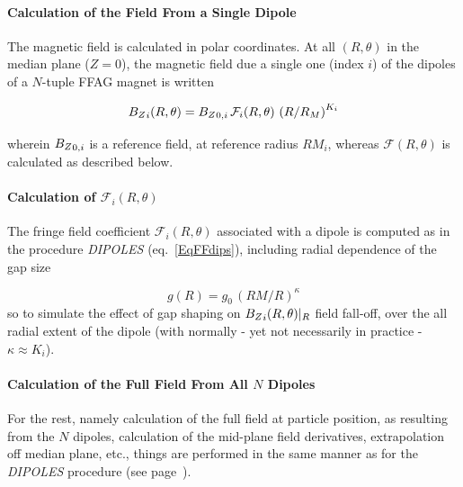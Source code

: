 \medskip


\paragraph{Calculation of the Field From a Single Dipole} 

 \noindent The magnetic field is calculated in  polar
coordinates.  At all $(R,\theta)$ in the median plane ($Z=0$), the 
magnetic field  due  a single one (index $i$) of the  dipoles  of a $N$-tuple FFAG  magnet is written 

$$ {B_Z}_i(R,\theta) =  {B_Z}_{0,i} \, \mathcal{F}_i(R,\theta) \, \left(   R/R_M \right)^{K_i}  $$

\noindent wherein ${B_Z}_{0,i}$  is a reference field, at reference radius  $RM_{i}$, 
 whereas $ \mathcal{F}(R,\theta)$ is calculated as described below. 



\paragraph{Calculation of $\mathcal{F}_i(R,\theta) $} 

\noindent The fringe field coefficient  $\mathcal{F}_i(R,\theta) $ associated with a  dipole is computed as in the 
procedure  \textsl{DIPOLES} (eq.~\ref{EqFFdips}), including  radial dependence of the gap size 

\begin{equation}
g(R) = g_0 \, (RM/R)^{\kappa}
\end{equation}
%
\noindent  so to simulate the effect of gap shaping on $ {B_Z}_i(R,\theta)|_R$ 
field fall-off,  over the 
all radial extent of the  dipole (with normally - yet not necessarily in practice - $\kappa \approx K_i$). 
 

\medskip

\paragraph{Calculation of the Full Field From All $N$ Dipoles}

For the rest, namely calculation of the full field at particle position, as resulting from the $N$ dipoles,  
  calculation of the  mid-plane field derivatives, 
extrapolation off median plane, etc., things are performed in the same manner  as for the 
 \textsl{DIPOLES} procedure (see page~\pageref{FFatAP}). 





